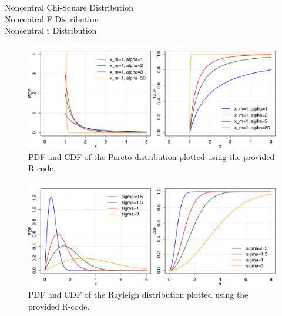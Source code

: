 Noncentral Chi-Square Distribution\\
Noncentral F Distribution\\
Noncentral t Distribution\\

\begin{figure}[htb!]
\centering
  \includegraphics[width=140mm]{pics/Pareto_pdf_cdf.pdf}
 \caption{PDF and CDF of the Pareto distribution plotted using the provided R-code.}
 \label{fig:Pareto_pdf_cdf}
\end{figure}

\begin{figure}[htb!]
\centering
  \includegraphics[width=140mm]{pics/Rayleigh_pdf_cdf.pdf}
 \caption{PDF and CDF of the Rayleigh distribution plotted using the provided R-code.}
 \label{fig:Rayleigh_pdf_cdf}
\end{figure}


